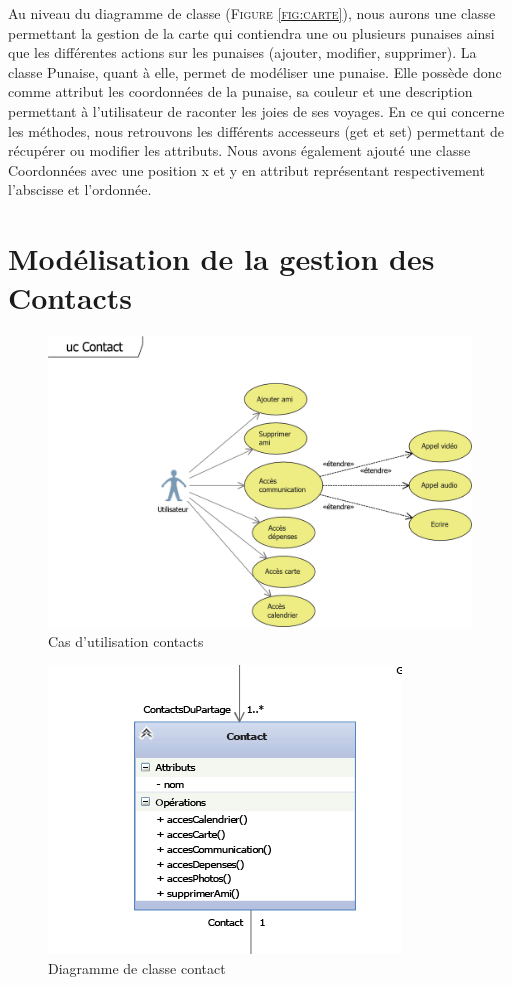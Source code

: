 \documentclass[11pt]{article}
\begin{document}
Au niveau du diagramme de classe  (\textsc{Figure \ref{fig:carte}}), nous aurons une classe permettant la gestion de la carte qui contiendra une ou plusieurs punaises ainsi que les différentes actions sur les punaises (ajouter, modifier, supprimer). La classe Punaise, quant à elle, permet de modéliser une punaise. Elle possède donc comme attribut les coordonnées de la punaise, sa couleur et une description permettant à l'utilisateur de raconter les joies de ses voyages. En ce qui concerne les méthodes, nous retrouvons les différents accesseurs (get et set) permettant de récupérer ou modifier les attributs. Nous avons également ajouté une classe Coordonnées avec une position x et y en attribut représentant respectivement l’abscisse et l’ordonnée.
\newpage
\section{Modélisation de la gestion des Contacts}
\begin{figure}[!h]
        \centering \includegraphics[scale=1]{ucContact.png}
        \caption{Cas d'utilisation contacts}
         \label{fig:ucContact}
\end{figure}
\begin{figure}[!h]
        \centering \includegraphics[scale=1]{contact.png}
        \caption{Diagramme de classe contact}
         \label{fig:contact}
\end{figure}
\end{document}

